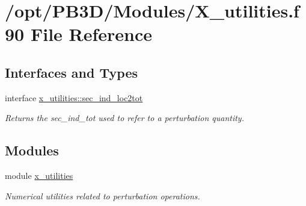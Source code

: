 \hypertarget{X__utilities_8f90}{}\section{/opt/\+P\+B3\+D/\+Modules/\+X\+\_\+utilities.f90 File Reference}
\label{X__utilities_8f90}
\subsection*{Interfaces and Types}
\begin{DoxyCompactItemize}
\item 
interface \hyperlink{interfacex__utilities_1_1sec__ind__loc2tot}{x\+\_\+utilities\+::sec\+\_\+ind\+\_\+loc2tot}
\begin{DoxyCompactList}\small\item\em Returns the {\ttfamily sec\+\_\+ind\+\_\+tot} used to refer to a perturbation quantity. \end{DoxyCompactList}\end{DoxyCompactItemize}
\subsection*{Modules}
\begin{DoxyCompactItemize}
\item 
module \hyperlink{namespacex__utilities}{x\+\_\+utilities}
\begin{DoxyCompactList}\small\item\em Numerical utilities related to perturbation operations. \end{DoxyCompactList}\end{DoxyCompactItemize}
